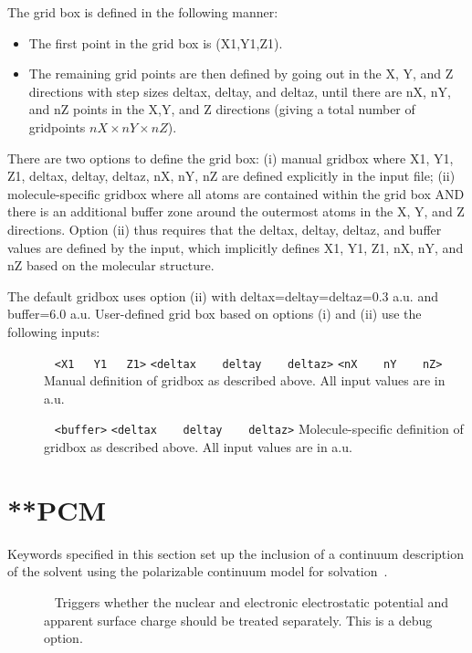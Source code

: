 The grid box is defined in the following manner:
\begin{itemize}
\item
The first point in the grid box is (X1,Y1,Z1).                                                 
\item
The remaining grid points are then defined by going out in the X, Y, and Z directions with step sizes deltax, deltay, and deltaz, until there are nX, nY, and nZ points in the X,Y, and Z directions (giving a total number of gridpoints $nX\times nY \times nZ$).      
\end{itemize}

There are two options to define the grid box: (i) manual gridbox where X1, Y1, Z1, deltax, deltay, deltaz, nX, nY, nZ are defined explicitly in the input file; (ii)
molecule-specific gridbox where all atoms are contained within the grid box AND there is an additional buffer zone around the outermost atoms in the X, Y, and Z directions. Option (ii) thus requires that the deltax, deltay, deltaz, and buffer values are defined by the input, which implicitly defines X1, Y1, Z1, nX, nY, and nZ based on the molecular structure.

The default gridbox uses option (ii) with {deltax=deltay=deltaz=0.3 a.u.} and {buffer=6.0 a.u}. 
User-defined grid box based on options (i) and (ii) use the following inputs:


\begin{description}
\item[] \verb| | \newline
\verb|<X1   Y1   Z1>| \newline
\verb|<deltax    deltay    deltaz>| \newline
\verb|<nX    nY    nZ>| \newline
Manual definition of gridbox as described above. All input values are in a.u.

\item[] \verb| | \newline
\verb|<buffer>| \newline
\verb|<deltax    deltay    deltaz>| \newline
Molecule-specific definition of gridbox as described above. All input values are in a.u.

\end{description}

\section{**PCM}\label{sec:pcm}
Keywords specified in this section set up the inclusion of a continuum description of the solvent using the polarizable continuum model for solvation~\cite{Tomasi2005}.

\begin{description}
\item[] \verb| | \newline
Triggers whether the nuclear and electronic electrostatic potential and apparent surface charge should be treated separately. This is a debug option.

\end{description}

